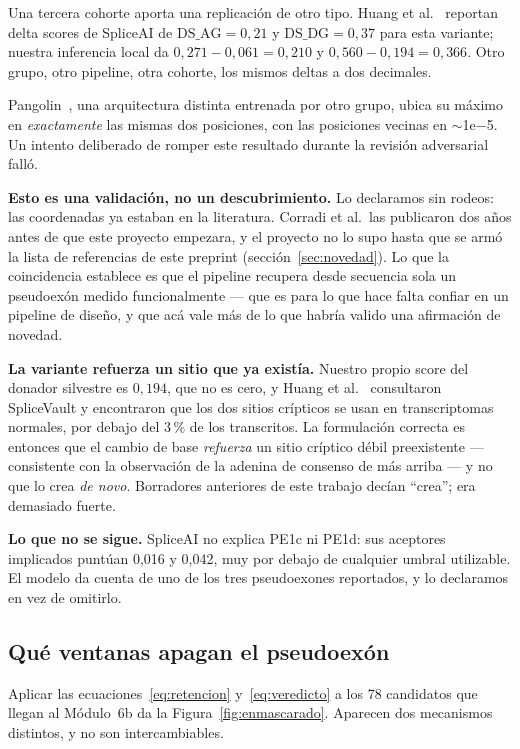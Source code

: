 \documentclass[11pt,a4paper]{article}
\begin{document}
Una tercera cohorte aporta una replicación de otro tipo. Huang et al.~\cite{huang2025} reportan
delta scores de SpliceAI de $\mathrm{DS\_AG} = 0{,}21$ y $\mathrm{DS\_DG} = 0{,}37$ para esta
variante; nuestra inferencia local da $0{,}271-0{,}061 = 0{,}210$ y $0{,}560-0{,}194 = 0{,}366$.
Otro grupo, otro pipeline, otra cohorte, los mismos deltas a dos decimales.

Pangolin~\cite{zeng2022}, una arquitectura distinta entrenada por otro grupo, ubica su máximo en
\emph{exactamente} las mismas dos posiciones, con las posiciones vecinas en $\sim$1e$-$5. Un intento
deliberado de romper este resultado durante la revisión adversarial falló.

\textbf{Esto es una validación, no un descubrimiento.} Lo declaramos sin rodeos: las coordenadas ya
estaban en la literatura. Corradi et al.\ las publicaron dos años antes de que este proyecto
empezara, y el proyecto no lo supo hasta que se armó la lista de referencias de este preprint
(sección~\ref{sec:novedad}). Lo que la coincidencia establece es que el pipeline recupera desde
secuencia sola un pseudoexón medido funcionalmente --- que es para lo que hace falta confiar en un
pipeline de diseño, y que acá vale más de lo que habría valido una afirmación de novedad.

\textbf{La variante refuerza un sitio que ya existía.} Nuestro propio score del donador silvestre es
$0{,}194$, que no es cero, y Huang et al.~\cite{huang2025} consultaron SpliceVault y encontraron que
los dos sitios crípticos se usan en transcriptomas normales, por debajo del 3\,\% de los
transcritos. La formulación correcta es entonces que el cambio de base \emph{refuerza} un sitio
críptico débil preexistente --- consistente con la observación de la adenina de consenso de más
arriba --- y no que lo crea \emph{de novo}. Borradores anteriores de este trabajo decían ``crea'';
era demasiado fuerte.

\textbf{Lo que no se sigue.} SpliceAI no explica PE1c ni PE1d: sus aceptores implicados puntúan
0,016 y 0,042, muy por debajo de cualquier umbral utilizable. El modelo da cuenta de uno de los tres
pseudoexones reportados, y lo declaramos en vez de omitirlo.

\subsection{Qué ventanas apagan el pseudoexón}

Aplicar las ecuaciones~\ref{eq:retencion} y~\ref{eq:veredicto} a los 78 candidatos que llegan al
Módulo~6b da la Figura~\ref{fig:enmascarado}. Aparecen dos mecanismos distintos, y no son
intercambiables.
\end{document}
